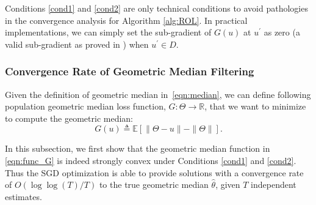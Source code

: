 \documentclass[11pt]{article}
\begin{document}
Conditions \ref{cond1} and \ref{cond2} are only technical conditions to avoid pathologies in the convergence analysis for Algorithm \ref{alg:ROL}. In practical implementations, we can simply set the  sub-gradient of $ G(u) $ at $ u^\prime $ as zero (a valid sub-gradient as proved in \cite{cardot2013efficient}) when  $ u^\prime \in D $.

\subsubsection{Convergence Rate of Geometric Median Filtering}

Given the definition of geometric median in~\eqref{eqn:median}, we can define following population geometric median loss function, $ G: \Theta \rightarrow \mathbb{R} $, that we want to minimize to compute the geometric median:
\begin{equation}
\label{eqn:func_G}
G(u) \triangleq \mathbb{E}\left[\|\Theta-u\| - \|\Theta\| \right].
\end{equation}


In this subsection, we first show that the geometric median function in \eqref{eqn:func_G} is indeed strongly convex under Conditions \ref{cond1} and \ref{cond2}. Thus the SGD optimization is able to provide solutions with a convergence rate of $ O(\log\log(T)/T) $ to the true geometric median $ \widehat{\theta} $, given $ T $ independent estimates.
\end{document}
